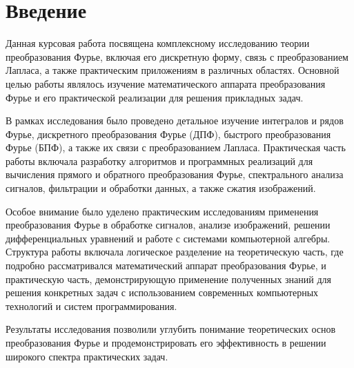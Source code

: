 \nocite{*}

\newpage
\thispagestyle{plain}  %
\section*{Введение}
 

Данная курсовая работа посвящена комплексному исследованию теории преобразования Фурье, включая его дискретную форму, связь с преобразованием Лапласа, а также практическим приложениям в различных областях. Основной целью работы являлось изучение математического аппарата преобразования Фурье и его практической реализации для решения прикладных задач.

В рамках исследования было проведено детальное изучение интегралов и рядов Фурье, дискретного преобразования Фурье (ДПФ), быстрого преобразования Фурье (БПФ), а также их связи с преобразованием Лапласа. Практическая часть работы включала разработку алгоритмов и программных реализаций для вычисления прямого и обратного преобразования Фурье, спектрального анализа сигналов, фильтрации и обработки данных, а также сжатия изображений.

Особое внимание было уделено практическим исследованиям применения преобразования Фурье в обработке сигналов, анализе изображений, решении дифференциальных уравнений и работе с системами компьютерной алгебры. Структура работы включала логическое разделение на теоретическую часть, где подробно рассматривался математический аппарат преобразования Фурье, и практическую часть, демонстрирующую применение полученных знаний для решения конкретных задач с использованием современных компьютерных технологий и систем программирования.

Результаты исследования позволили углубить понимание теоретических основ преобразования Фурье и продемонстрировать его эффективность в решении широкого спектра практических задач.




